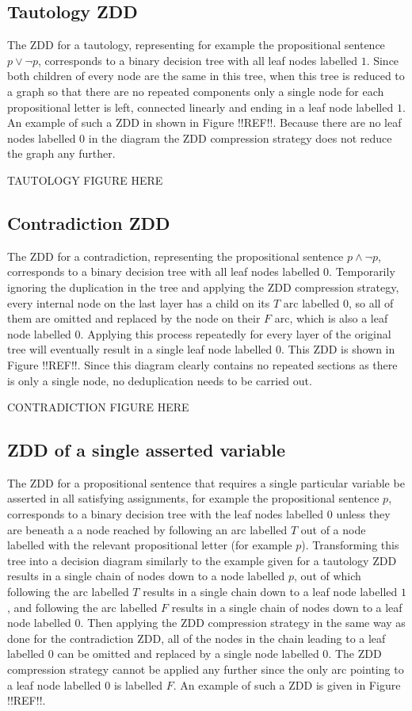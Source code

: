 \documentclass[12pt,a4paper,twoside,openright]{report}
\begin{document}
\subsection{Tautology ZDD}
The ZDD for a tautology, representing for example the propositional sentence $p\vee\neg p$, corresponds to a binary decision tree with all leaf nodes labelled $1$. Since both children of every node are the same in this tree, when this tree is reduced to a graph so that there are no repeated components only a single node for each propositional letter is left, connected linearly and ending in a leaf node labelled $1$. An example of such a ZDD in shown in Figure !!REF!!. Because there are no leaf nodes labelled $0$ in the diagram the ZDD compression strategy does not reduce the graph any further.

TAUTOLOGY FIGURE HERE

\subsection{Contradiction ZDD}
The ZDD for a contradiction, representing the propositional sentence $p\wedge\neg p$, corresponds to a binary decision tree with all leaf nodes labelled $0$. Temporarily ignoring the duplication in the tree and applying the ZDD compression strategy, every internal node on the last layer has a child on its $T$ arc labelled $0$, so all of them are omitted and replaced by the node on their $F$ arc, which is also a leaf node labelled $0$. Applying this process repeatedly for every layer of the original tree will eventually result in a single leaf node labelled $0$. This ZDD is shown in Figure !!REF!!. Since this diagram clearly contains no repeated sections as there is only a single node, no deduplication needs to be carried out.

CONTRADICTION FIGURE HERE

\subsection{ZDD of a single asserted variable}
The ZDD for a propositional sentence that requires a single particular variable be asserted in all satisfying assignments, for example the propositional sentence $p$, corresponds to a binary decision tree with the leaf nodes labelled $0$ unless they are beneath a a node reached by following an arc labelled $T$ out of a node labelled with the relevant propositional letter (for example $p$). Transforming this tree into a decision diagram similarly to the example given for a tautology ZDD results in a single chain of nodes down to a node labelled $p$, out of which following the arc labelled $T$ results in a single chain down to a leaf node labelled $1$, and following the arc labelled $F$ results in a single chain of nodes down to a leaf node labelled $0$. Then applying the ZDD compression strategy in the same way as done for the contradiction ZDD, all of the nodes in the chain leading to a leaf labelled $0$ can be omitted and replaced by a single node labelled $0$. The ZDD compression strategy cannot be applied any further since the only arc pointing to a leaf node labelled $0$ is labelled $F$. An example of such a ZDD is given in Figure !!REF!!.
\end{document}
